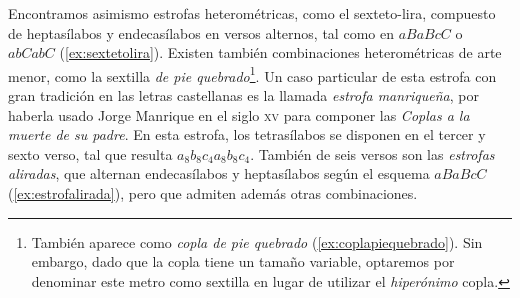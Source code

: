 

Encontramos asimismo estrofas heterométricas, como el sexteto-lira, compuesto de heptasílabos y endecasílabos en versos alternos, tal como en $aBaBcC$ o $abCabC$ (\ref{ex:sextetolira}). Existen también combinaciones heterométricas de arte menor, como la sextilla \textit{de pie quebrado}\footnote{También aparece como \textit{copla de pie quebrado} (\ref{ex:coplapiequebrado}). Sin embargo, dado que la copla tiene un tamaño variable, optaremos por denominar este metro como sextilla en lugar de utilizar el \textit{hiperónimo} copla.}. Un caso particular de esta estrofa con gran tradición en las letras castellanas es la llamada \textit{estrofa manriqueña}, por haberla usado Jorge Manrique en el siglo \textsc{xv} para componer las \textit{Coplas a la muerte de su padre}. En esta estrofa, los tetrasílabos se disponen en el tercer y sexto verso, tal que resulta $a_{8}b_{8}c_{4}a_{8}b_{8}c_{4}$. También de seis versos son las \textit{estrofas aliradas}, que alternan endecasílabos y heptasílabos según el esquema $aBaBcC$ (\ref{ex:estrofalirada}), pero que admiten además otras combinaciones.

